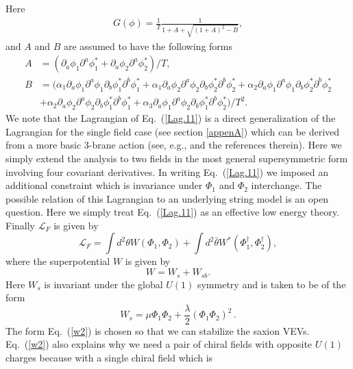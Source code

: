 \documentclass[a4paper,11pt]{article}
\def\non{\nonumber\\}
\def\non{\nonumber\\}
\begin{document}
  Here
  \begin{align}
    G(\phi) = \frac{1}{T}\frac{1}{1+ A +\sqrt{(1+A)^2 -B}},
  \end{align}
  and $A$ and $B$ are assumed to have the following forms
  \begin{align}
    A &= (\partial_a\phi_1 \partial^a \phi^*_1 + \partial_a\phi_2 \partial^a \phi^*_2)/T, \non
    B &= \Big(
      \alpha_1\partial_a \phi_1 \partial^a \phi_1 \partial_b \phi^*_1 \partial^b \phi^*_1
      + \alpha_1 \partial_a \phi_2 \partial^a \phi_2 \partial_b \phi^*_2 \partial^b \phi^*_2
      + \alpha_2 \partial_a \phi_1 \partial^a \phi_1 \partial_b \phi^*_2 \partial^b \phi^*_2 \non
    & + \alpha_2 \partial_a \phi_2 \partial^a \phi_2 \partial_b \phi^*_1 \partial^b \phi^*_1
      + \alpha_3 \partial_a \phi_1 \partial^a \phi_2 \partial_b \phi^*_1 \partial^b \phi^*_2
    \Big) / T^2.
    \label{Lag.22}
  \end{align}
  We note that the Lagrangian of Eq.~(\ref{Lag.11}) is a direct generalization of the Lagrangian for the single field
  case (see section \ref{appenA}) which can be derived from a more basic 3-brane action (see, e.g., \cite{Sasaki:2012ka} and the references
  therein). Here we simply extend the analysis to two fields
  in the most general supersymmetric form involving four covariant derivatives. In writing Eq.~(\ref{Lag.11}) we imposed
  an additional constraint which is invariance under $\Phi_1$ and $\Phi_2$ interchange.
  The possible relation of this Lagrangian
  to an underlying string model is an open question. Here we simply treat Eq.~(\ref{Lag.11}) as an effective low energy
  theory. Finally $\mathcal{L}_{F}$ is given by
  \begin{equation}
    \mathcal{L}_{F}=\int d^2\theta W\left(\Phi_1,\Phi_2\right)+\int d^2\bar\theta
    W^* \left(\Phi_1^\dagger,\Phi_2^\dagger\right),
  \end{equation}
  where the superpotential $W$ is given by
  \begin{equation}
    W=W_s+W_{sb}.
    \label{w1}
  \end{equation}
  Here $W_s$ is invariant under the global $U(1)$ symmetry and is taken to be of the form
  \begin{equation}
    W_s=\mu \Phi_1\Phi_2+\frac{\lambda}{2}{\left(\Phi_1\Phi_2\right)}^2\,.
    \label{w2}
  \end{equation}
  The form Eq.~(\ref{w2}) is chosen so that we can stabilize the saxion VEVs. Eq.~(\ref{w2}) also explains
  why we need a pair of chiral fields with opposite $U(1)$ charges because with a single chiral field which is
\end{document}
